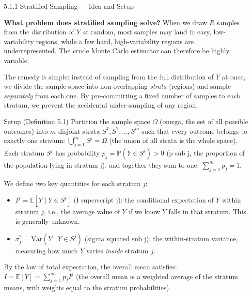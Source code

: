 \documentclass[aspectratio=169,10pt]{beamer}
\begin{document}
\begin{frame}[allowframebreaks]{5.1.1 Stratified Sampling --- Idea and Setup}

\textbf{What problem does stratified sampling solve?}
When we draw $R$ samples from the distribution of $Y$ at random, most samples
may land in easy, low-variability regions, while a few hard, high-variability
regions are underrepresented.  The crude Monte Carlo estimator can therefore
be highly variable.

The remedy is simple: instead of sampling from the full distribution of $Y$
at once, we divide the sample space into non-overlapping \emph{strata} (regions)
and sample \emph{separately} from each one.  By pre-committing a fixed number
of samples to each stratum, we prevent the accidental under-sampling of any
region.

\begin{block}{Setup (Definition 5.1)}
  Partition the sample space $\Omega$ (omega, the set of all possible outcomes)
  into $m$ disjoint strata $S^1, S^2, \ldots, S^m$ such that every outcome
  belongs to exactly one stratum:
  $\bigcup_{j=1}^m S^j = \Omega$ (the union of all strata is the whole space).
  Each stratum $S^j$ has probability $p_j = \mathbb{P}(Y \in S^j) > 0$
  (p sub j, the proportion of the population lying in stratum j),
  and together they sum to one: $\sum_{j=1}^m p_j = 1$.

  We define two key quantities for each stratum $j$:
  \begin{itemize}
    \item $I^j = \mathbb{E}[Y \mid Y \in S^j]$ (I superscript j): the conditional
          expectation of $Y$ within stratum $j$, i.e., the average value of $Y$
          if we know $Y$ falls in that stratum.  This is generally unknown.
    \item $\sigma_j^2 = \mathrm{Var}(Y \mid Y \in S^j)$ (sigma squared sub j):
          the within-stratum variance, measuring how much $Y$ varies
          \emph{inside} stratum $j$.
  \end{itemize}

  By the law of total expectation, the overall mean satisfies:
  $I = \mathbb{E}[Y] = \sum_{j=1}^m p_j I^j$
  (the overall mean is a weighted average of the stratum means,
  with weights equal to the stratum probabilities).
\end{block}

\framebreak


\end{frame}
\end{document}
